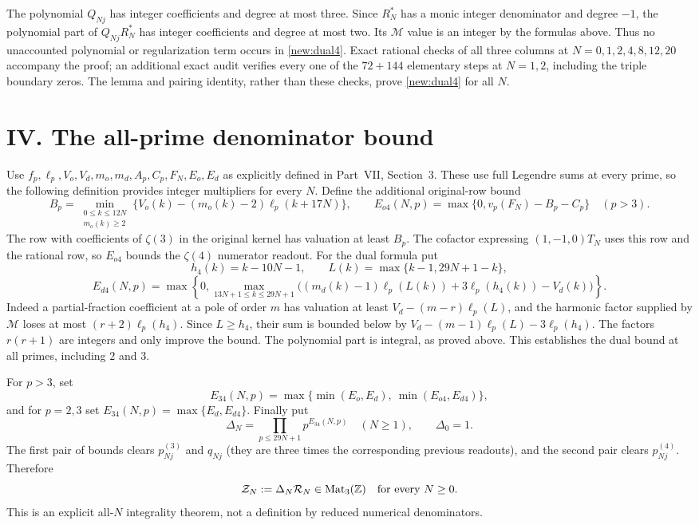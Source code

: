 \documentclass[11pt]{article}
\newcommand{\Z}{\mathbb Z}
\begin{document}
The polynomial $Q_{Nj}$ has integer coefficients and degree at most three.
Since $R_N^*$ has a monic integer denominator and degree $-1$, the polynomial
part of $Q_{Nj}R_N^*$ has integer coefficients and degree at most two.
Its $\mathcal M$ value is an integer by the formulas above. Thus no unaccounted
polynomial or regularization term occurs in \eqref{new:dual4}.
Exact rational checks of all three columns at $N=0,1,2,4,8,12,20$ accompany
the proof; an additional exact audit verifies every one of the $72+144$ elementary
steps at $N=1,2$, including the triple boundary zeros. The lemma and pairing
identity, rather than these checks, prove
\eqref{new:dual4} for all $N$.

\section*{IV. The all-prime denominator bound}
Use $f_p,\ell_p,V_o,V_d,m_o,m_d,A_p,C_p,F_N,E_o,E_d$ as explicitly defined
in Part~VII, Section~3. These use full Legendre sums at every prime, so the
following definition provides integer multipliers for every $N$.
Define the additional original-row bound
\[
 B_p=\min_{\substack{0\le k\le12N\\m_o(k)\ge2}}
 \{V_o(k)-(m_o(k)-2)\ell_p(k+17N)\},\qquad
 E_{o4}(N,p)=\max\{0,v_p(F_N)-B_p-C_p\}\quad(p>3).
\]
The row with coefficients of $\zeta(3)$ in the original kernel has valuation
at least $B_p$. The cofactor expressing $(1,-1,0)T_N$ uses this row and the
rational row, so $E_{o4}$ bounds the $\zeta(4)$ numerator readout.
For the dual formula put
\[
 h_4(k)=k-10N-1,\qquad L(k)=\max\{k-1,29N+1-k\},
\]
\[
 E_{d4}(N,p)=\max\left\{0,
 \max_{13N+1\le k\le29N+1}
 \bigl((m_d(k)-1)\ell_p(L(k))+3\ell_p(h_4(k))-V_d(k)\bigr)\right\}.
\]
Indeed a partial-fraction coefficient at a pole of order $m$ has valuation
at least $V_d-(m-r)\ell_p(L)$, and the harmonic factor supplied by
$\mathcal M$ loses at most $(r+2)\ell_p(h_4)$.
Since $L\ge h_4$, their sum is bounded below by
$V_d-(m-1)\ell_p(L)-3\ell_p(h_4)$.
The factors $r(r+1)$ are integers and only improve the bound.
The polynomial part is integral, as proved above. This establishes the dual
bound at all primes, including $2$ and $3$.

For $p>3$, set
\[
 E_{34}(N,p)=\max\{\min(E_o,E_d),\ \min(E_{o4},E_{d4})\},
\]
and for $p=2,3$ set $E_{34}(N,p)=\max\{E_d,E_{d4}\}$.
Finally put
\begin{equation}\label{new:deltaN}
 \Delta_N=\prod_{p\le29N+1}p^{E_{34}(N,p)}\quad(N\ge1),\qquad\Delta_0=1.
\end{equation}
The first pair of bounds clears $p^{(3)}_{Nj}$ and $q_{Nj}$ (they are three
times the corresponding previous readouts), and the second pair clears
$p^{(4)}_{Nj}$. Therefore
\begin{equation}\label{new:integer}
 \mathcal Z_N:=\Delta_N\mathcal R_N\in\operatorname{Mat}_3(\Z)
 \quad\hbox{for every }N\ge0.
\end{equation}
This is an explicit all-$N$ integrality theorem, not a definition by reduced
numerical denominators.
\end{document}
